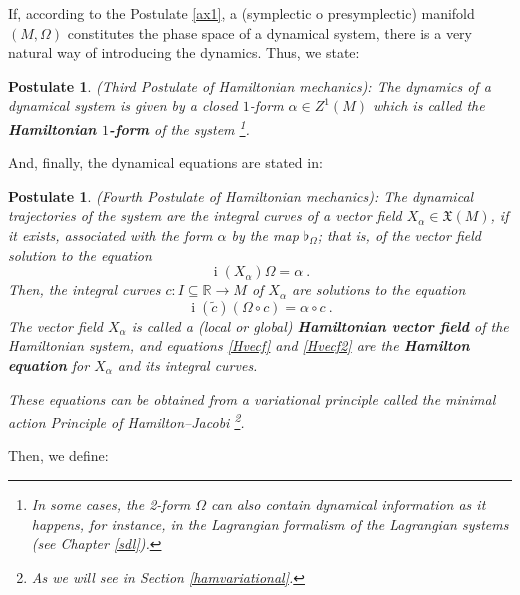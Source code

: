 \documentclass[12pt]{report}
\newtheorem{pos}[teor]{Postulate}
\def\beq{\begin{equation}}
\def\eeq{\end{equation}}
\def\vf{\mathfrak X}
\def\Real{\mathbb{R}}
\def\inn{\mathop{i}\nolimits}
\begin{document}
If, according to the Postulate \ref{ax1},
a (symplectic o presymplectic) manifold $(M,\Omega )$
constitutes the phase space of a dynamical system,
there is a very natural way of introducing the dynamics.
Thus, we state:

\begin{pos}
{\rm (Third Postulate of Hamiltonian mechanics\/)}:
The dynamics of a dynamical  system
is given by a closed $1$-form $\alpha \in Z^1(M)$
which is called the {\sl \textbf{Hamiltonian $1$-form}} of the system
\footnote{
In some cases, the 2-form $\Omega$ can also contain dynamical information
as it happens, for instance, in the Lagrangian formalism of  the Lagrangian systems
(see Chapter \ref{sdl}).}.
\end{pos}

And, finally, the dynamical equations are stated in:

\begin{pos}
{\rm (Fourth Postulate of Hamiltonian mechanics\/)}:
The dynamical trajectories of the system are the integral curves
of a vector field $X_{\alpha} \in \vf(M)$, if it exists, associated with the form $\alpha$
by the map $\flat_\Omega$; that is,
of the vector field solution to the equation
\beq
\label{Hvecf}
\inn(X_{\alpha})\Omega = \alpha \ .
\eeq
Then, the integral curves $c\colon I\subseteq\Real\to M$ of $X_\alpha$ are solutions to the equation
\beq
\label{Hvecf2}
\inn(\widetilde c)(\Omega\circ c)=\alpha\circ c \ . 
\eeq
The vector field $X_\alpha$ is called a (local or global) {\sl \textbf{Hamiltonian vector field}}
of the Hamiltonian system, and equations \eqref{Hvecf} and \eqref{Hvecf2} are the {\sl \textbf{Hamilton equation}} for $X_\alpha$
and its integral curves.

These equations can be obtained from a variational principle called
the {\sl  minimal action Principle of Hamilton--Jacobi}
\footnote{
As we will see in Section \ref{hamvariational}.}.
\label{ax3}
\end{pos}

Then, we define:
\end{document}
